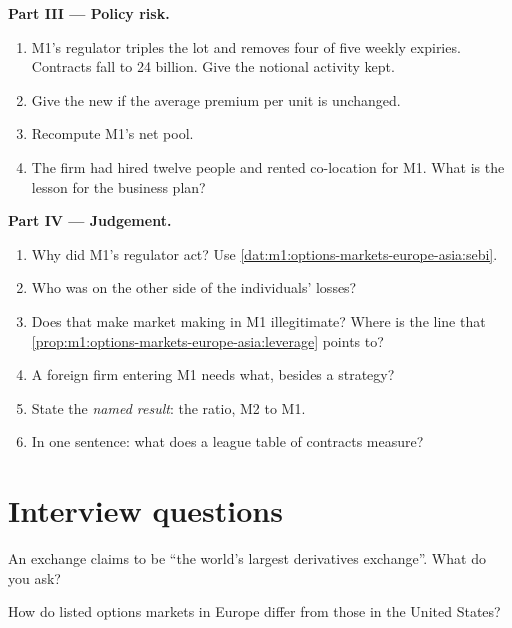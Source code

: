 \begin{problem}
\medskip\noindent\textbf{Part III --- Policy risk.}
\begin{enumerate}[resume]
\item M1's regulator triples the lot and removes four of five weekly
expiries. Contracts fall to 24 billion. Give the notional activity kept.
\item Give the new  if the average premium per unit is
unchanged.
\item Recompute M1's net pool.
\item The firm had hired twelve people and rented co-location for M1. What
is the lesson for the business plan?
\end{enumerate}

\medskip\noindent\textbf{Part IV --- Judgement.}
\begin{enumerate}[resume]
\item Why did M1's regulator act? Use
\cref{dat:m1:options-markets-europe-asia:sebi}.
\item Who was on the other side of the individuals' losses?
\item Does that make market making in M1 illegitimate? Where is the line
that \cref{prop:m1:options-markets-europe-asia:leverage} points to?
\item A foreign firm entering M1 needs what, besides a strategy?
\item State the \emph{named result}: the  ratio, M2 to M1.
\item In one sentence: what does a league table of contracts measure?
\end{enumerate}
\end{problem}

\section{Interview questions}

\begin{interviewq}\label{iq:m1:options-markets-europe-asia:1}
An exchange claims to be ``the world's largest derivatives exchange''. What
do you ask?
\end{interviewq}

\begin{interviewq}\label{iq:m1:options-markets-europe-asia:2}
How do listed options markets in Europe differ from those in the United
States?
\end{interviewq}

